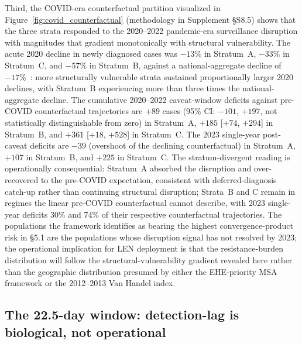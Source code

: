 \documentclass[12pt]{article}
\begin{document}
Third, the COVID-era counterfactual partition visualized in Figure~\ref{fig:covid_counterfactual} (methodology in Supplement §S8.5) shows that the three strata responded to the 2020--2022 pandemic-era surveillance disruption with magnitudes that gradient monotonically with structural vulnerability. The acute 2020 decline in newly diagnosed cases was $-13\%$ in Stratum~A, $-33\%$ in Stratum~C, and $-57\%$ in Stratum~B, against a national-aggregate decline of $-17\%$~\cite{dinenno2022}: more structurally vulnerable strata sustained proportionally larger 2020 declines, with Stratum~B experiencing more than three times the national-aggregate decline. The cumulative 2020--2022 caveat-window deficits against pre-COVID counterfactual trajectories are $+89$ cases (95\% CI: $-101$, $+197$, not statistically distinguishable from zero) in Stratum~A, $+185$ [$+74$, $+294$] in Stratum~B, and $+361$ [$+18$, $+528$] in Stratum~C. The 2023 single-year post-caveat deficits are $-39$ (overshoot of the declining counterfactual) in Stratum~A, $+107$ in Stratum~B, and $+225$ in Stratum~C. The stratum-divergent reading is operationally consequential: Stratum~A absorbed the disruption and over-recovered to the pre-COVID expectation, consistent with deferred-diagnosis catch-up rather than continuing structural disruption; Strata~B and C remain in regimes the linear pre-COVID counterfactual cannot describe, with 2023 single-year deficits 30\% and 74\% of their respective counterfactual trajectories. 
The populations the framework identifies as bearing the highest convergence-product risk in §5.1 are the populations whose disruption signal has not resolved by 2023; the operational implication for LEN deployment is that the resistance-burden distribution will follow the structural-vulnerability gradient revealed here rather than the geographic distribution presumed by either the EHE-priority MSA framework or the 2012--2013 Van Handel index.


\subsection{The 22.5-day window: detection-lag is biological, not operational}
\end{document}
